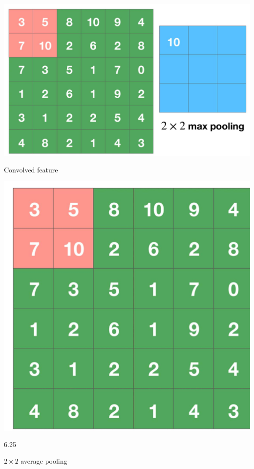 \documentclass[10pt]{article}
\begin{document}
\begin{center}
\includegraphics[max width=\textwidth]{2024_01_08_959e2db67a31f073f6d2g-10(1)}
\end{center}

Convolved feature

\begin{center}
\includegraphics[max width=\textwidth]{2024_01_08_959e2db67a31f073f6d2g-10}
\end{center}

6.25

$2 \times 2$ average pooling
\end{document}
